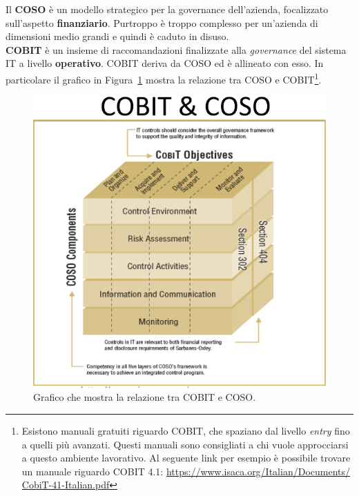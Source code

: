 Il \textbf{COSO} è un modello strategico per la governance dell'azienda,
focalizzato sull'aspetto \textbf{finanziario}.
Purtroppo è troppo complesso per un'azienda di dimensioni medio grandi e
quindi è caduto in disuso.\\
\newline
\textbf{COBIT} è un insieme di raccomandazioni finalizzate alla \textit{
governance}
del sistema IT a livello \textbf{operativo}.
COBIT deriva da COSO ed è allineato con esso. In particolare il grafico in
Figura~\ref{fig:cobit:coso:relazione} mostra la relazione tra COSO e
COBIT\footnote{Esistono manuali gratuiti
riguardo COBIT, che spaziano dal livello \textit{entry} fino a quelli più
avanzati. Questi manuali sono consigliati a chi vuole approcciarsi a questo
ambiente lavorativo. Al seguente link per esempio è possibile trovare un
manuale riguardo COBIT 4.1:  \url{https://www.isaca.org/Italian/Documents/
CobiT-41-Italian.pdf}}.

\begin{figure}[h!]
        \begin{center}
                \includegraphics[scale=2.0]{res/img/cobit_coso_cube}
        \end{center}
        \caption{Grafico che mostra la relazione tra COBIT e COSO.}
        \label{fig:cobit:coso:relazione}
\end{figure}

